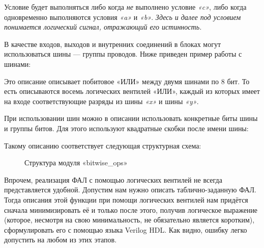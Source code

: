 \documentclass[a5paper, DIV=14, headings=openany, twoside=true,fontsize=10pt, titlepage]{scrreprt}
\newcommand{\quotes}[1]{«#1»}
\newcommand{\eng}[1]{\foreignlanguage{english}{#1}}
\newcommand{\qeng}[1]{\quotes{\foreignlanguage{english}{#1}}}
\begin{document}
\par{Условие будет выполняться либо когда \emph{не} выполнено условие \emph{\qeng{c}}, либо когда одновременно выполняются условия \emph{\qeng{a}} и \emph{\qeng{b}}. \emph{Здесь и далее под условием понимается логический сигнал, отражающий его истинность.}}
\par{В качестве входов, выходов и внутренних соединений в блоках могут использоваться шины — группы проводов. Ниже приведен пример работы с шинами:}

\begin{minipage}{\linewidth}

\end{minipage}

\par{Это описание описывает побитовое \quotes{ИЛИ} между двумя шинами по 8 бит. То есть описываются восемь логических вентилей \quotes{ИЛИ}, каждый из которых имеет на входе соответствующие разряды из шины \emph{\qeng{x}} и шины \emph{\qeng{y}}.}

\par{При использовании шин можно в описании использовать конкретные биты шины и группы битов. Для этого используют квадратные скобки после имени шины:}

\begin{minipage}{\linewidth}

\end{minipage}

\begin{minipage}{\textwidth}
\par{Такому описанию соответствует следующая структурная схема:}

\begin{figure}[H]
\centering
\def\svgwidth{\columnwidth}

\caption{Структура модуля \qeng{bitwise\_ops}}
\end{figure}
\end{minipage}


\par{Впрочем, реализация ФАЛ с помощью логических вентилей не всегда представляется удобной. Допустим нам нужно описать таблично-заданную ФАЛ. Тогда описания этой функции при помощи логических вентилей нам придётся сначала минимизировать её и только после этого, получив логическое выражение (которое, несмотря на свою минимальность, не обязательно является коротким), сформулировать его с помощью языка \eng{Verilog HDL}. Как видно, ошибку легко допустить на любом из этих этапов.}
 
\end{document}
